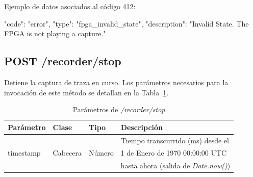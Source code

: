 \begin{itemize}
{\begin{minipage}{\textwidth}
Ejemplo de datos asociados al código 412:

\begin{code}[language=json]
{
  "code": "error",
  "type": "fpga_invalid_state",
  "description": "Invalid State. The FPGA is not playing a capture."
}
\end{code}
\end{minipage}
}

\end{itemize}

%
%
\subsection{POST /recorder/stop}
Detiene la captura de \gls{traza} en curso.
Los parámetros necesarios para la invocación de este método se detallan en la Tabla~\ref{extra:api:recorderstop:invocacion}.

\begin{table}[H]
\centering
\begin{tabular}{|l|l|l|l|}
\hline
\rowcolor[HTML]{F5F5F5}
\textbf{Parámetro}  & \textbf{Clase} & \textbf{Tipo}   & \textbf{Descripción}                         \\ \hline
                    &                &                 & Tiempo transcurrido (ms) desde el            \\
timestamp           & Cabecera       & Número          & 1 de Enero de 1970 00:00:00 UTC              \\
                    &                &                 & hasta ahora (salida de \textit{Date.now()})  \\ \hline
\end{tabular}
\caption{Parámetros de \textit{/recorder/stop}}
\label{extra:api:recorderstop:invocacion}
\end{table}

